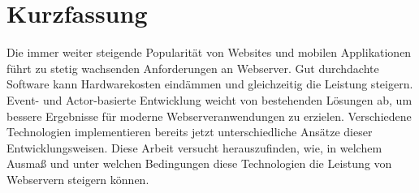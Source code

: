 \chapter{Kurzfassung}

Die immer weiter steigende Popularit{\"a}t von Websites und mobilen Applikationen f{\"u}hrt zu stetig wachsenden Anforderungen an Webserver. Gut durchdachte Software kann Hardwarekosten eind{\"a}mmen und gleichzeitig die Leistung steigern. Event- und Actor-basierte Entwicklung weicht von bestehenden L{\"o}sungen ab, um bessere Ergebnisse f{\"u}r moderne Webserveranwendungen zu erzielen. Verschiedene Technologien implementieren bereits jetzt unterschiedliche Ans{\"a}tze dieser Entwicklungsweisen. Diese Arbeit versucht herauszufinden, wie, in welchem Ausma{\ss} und unter welchen Bedingungen diese Technologien die Leistung von Webservern steigern k{\"o}nnen.

